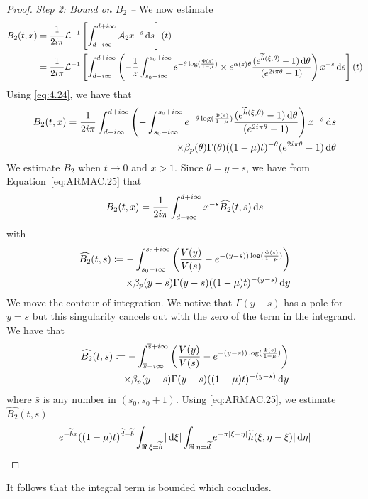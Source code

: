 \begin{proof}
\medskip
\textit{Step 2: Bound on $B_2$ --} 
We now estimate 
\begin{align*}
    B_2(t,x)
    &= 
    \frac{1}{2i\pi} \mathcal{L}^{-1}\left[\int_{d-i\infty}^{d+i\infty} \mathcal{A}_2 x^{-s}\,\mathrm{d} s \right] (t)    \\
    &= \frac{1}{2i\pi} \mathcal{L}^{-1}\left[\int_{d-i\infty}^{d+i\infty} \left( - \frac{1}{z}\int_{s_0-i\infty}^{s_0+i\infty} e^{-\theta\log(\frac{\Phi(s)}{1-\mu})} \times e^{ \alpha(z)\theta}
    \frac{(e^{\widetilde h(\xi, \theta)} - 1)\,\mathrm{d} \theta}{(e^{2i\pi\theta}-1)} \right) x^{-s}\,\mathrm{d} s \right] (t) 
\end{align*}
Using \eqref{eq:4.24}, we have that 
\begin{align*}
    B_2(t,x)
    = 
    \frac{1}{2i\pi}\int_{d-i\infty}^{d+i\infty} \left( - \int_{s_0-i\infty}^{s_0+i\infty} e^{-\theta\log(\frac{\Phi(s)}{1-\mu})}
    \frac{(e^{\widetilde h(\xi, \theta)} - 1)\,\mathrm{d} \theta}{(e^{2i\pi\theta}-1)} \right) x^{-s}\,\mathrm{d} s \\
    \times \beta_p(\theta) \Gamma(\theta)((1-\mu)t)^{-\theta}(e^{2i\pi\theta}-1) \,\mathrm{d} \theta
\end{align*} 
We estimate $B_2$ when $t \to 0$ and $x > 1$. Since $\theta = y-s$, we have from Equation~\eqref{eq:ARMAC.25} that 
\begin{align*}
    B_2(t, x) = 
    \frac{1}{2i\pi}\int_{d-i\infty}^{d+i\infty} x^{-s} \widehat{B_2}(t,s)\,\mathrm{d} s
\end{align*}
with 
\begin{align*}
    \widehat{B_2}(t,s) \coloneqq  - \int_{s_0-i\infty}^{s_0+i\infty}  \left(\frac{V(y)}{V(s)}  -e^{-(y-s))\log(\frac{\Phi(s)}{1-\mu})}\right)
    \\
    \times
    \beta_p(y-s) \Gamma(y-s)((1-\mu)t)^{-(y-s)}\,\mathrm{d} y
\end{align*}
We move the contour of integration. We notive that $\Gamma(y-s)$ has a pole for $y = s$ but this singularity cancels out with the zero of the term in the integrand. We have that
\begin{align*}
    \widehat{B_2}(t,s) \coloneqq  - \int_{\overline s-i\infty}^{\overline s+i\infty}  \left(\frac{V(y)}{V(s)}  -e^{-(y-s))\log(\frac{\Phi(s)}{1-\mu})}\right)
    \\
    \times
    \beta_p(y-s) \Gamma(y-s)((1-\mu)t)^{-(y-s)}\,\mathrm{d} y
\end{align*}
where $\bar s$ is any number in $(s_0, s_0+1)$. Using \eqref{eq:ARMAC.25}, we estimate $\hat{B_2}(t,s)$
\begin{align*}
    e^{-\widetilde b x} ((1-\mu)t)^{\widetilde d - \widetilde b} 
    \int_{\Re \,\xi = \widetilde b} |\,\mathrm{d} \xi| 
    \int_{\Re \,\eta = \widetilde d} e^{-\pi |\xi - \eta|} \widetilde h(\xi, \eta - \xi) |\,\mathrm{d} \eta|
\end{align*}
\end{proof}
It follows that the integral term is bounded which concludes. 

